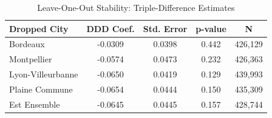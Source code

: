 \begin{table}[!h]
\centering
\caption{\label{tab:tab:loo}Leave-One-Out Stability: Triple-Difference Estimates}
\centering
\begin{tabular}[t]{lcccc}
\toprule
Dropped City & DDD Coef. & Std. Error & p-value & N\\
\midrule
Bordeaux & -0.0309 & 0.0398 & 0.442 & 426,129\\
Montpellier & -0.0574 & 0.0473 & 0.232 & 426,363\\
Lyon-Villeurbanne & -0.0650 & 0.0419 & 0.129 & 439,993\\
Plaine Commune & -0.0654 & 0.0444 & 0.150 & 435,309\\
Est Ensemble & -0.0645 & 0.0445 & 0.157 & 428,744\\
\bottomrule
\end{tabular}
\end{table}

